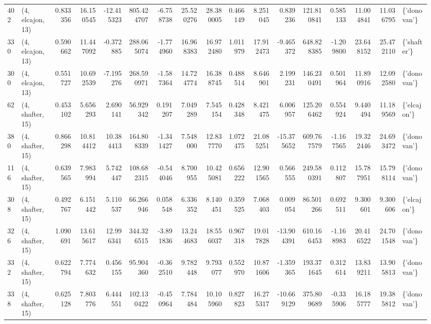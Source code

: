\begin{tabular}{llrrrrrrrrrrrrrrl}
402 &  (4, elcajon, 13) &   0.833356 &  16.150545 & -12.415323 &   805.424707 &  -6.758738 &  25.520276 &  28.380005 &  0.466149 &   8.251045 &   0.839236 &   121.810841 &   0.585133 &  11.004841 &  11.036795 &  \{'donovan'\} \\
330 &  (4, elcajon, 13) &   0.590662 &  11.447092 &  -0.372885 &   288.065074 &  -1.774960 &  16.968383 &  16.972480 &  1.011979 &  17.912473 &  -9.465372 &   648.828385 &  -1.209800 &  23.648152 &  25.472110 &  \{'shafter'\} \\
300 &  (4, elcajon, 13) &   0.551727 &  10.692539 &  -7.195276 &   268.590971 &  -1.587364 &  14.724774 &  16.388745 &  0.488514 &   8.646901 &   2.199231 &   146.230491 &   0.501964 &  11.890916 &  12.092580 &  \{'donovan'\} \\
62  &  (4, shafter, 15) &   0.453102 &   5.656293 &   2.690141 &    56.929342 &   0.191207 &   7.049289 &   7.545154 &  0.428348 &   8.421475 &   6.006957 &   125.206462 &   0.554924 &   9.440494 &  11.189569 &  \{'elcajon'\} \\
380 &  (4, shafter, 15) &   0.866298 &  10.814412 &  10.384413 &   164.808339 &  -1.341427 &   7.548000 &  12.837770 &  1.072475 &  21.085251 & -15.375652 &   609.767579 &  -1.167565 &  19.322446 &  24.693472 &  \{'donovan'\} \\
116 &  (4, shafter, 15) &   0.639565 &   7.983994 &   5.742447 &   108.682315 &  -0.544046 &   8.700955 &  10.425081 &  0.656222 &  12.901565 &   0.566555 &   249.580391 &   0.112807 &  15.787951 &  15.798114 &  \{'donovan'\} \\
308 &  (4, shafter, 15) &   0.492767 &   6.151442 &   5.110537 &    66.266946 &   0.058548 &   6.336352 &   8.140451 &  0.359525 &   7.068403 &   0.009054 &    86.501266 &   0.692511 &   9.300601 &   9.300606 &  \{'elcajon'\} \\
326 &  (4, shafter, 15) &   1.090691 &  13.615617 &  12.996341 &   344.326515 &  -3.891836 &  13.244683 &  18.556037 &  0.967318 &  19.017828 & -13.904391 &   610.166453 &  -1.168983 &  20.416522 &  24.701548 &  \{'donovan'\} \\
332 &  (4, shafter, 15) &   0.622794 &   7.774632 &   0.456155 &    95.904360 &  -0.362510 &   9.782448 &   9.793077 &  0.552970 &  10.871606 &  -1.359365 &   193.371645 &   0.312614 &  13.839211 &  13.905813 &  \{'donovan'\} \\
338 &  (4, shafter, 15) &   0.625128 &   7.803776 &   6.444551 &   102.130422 &  -0.450964 &   7.784484 &  10.105960 &  0.827823 &  16.275317 & -10.669129 &   375.809689 &  -0.335906 &  16.185777 &  19.385812 &  \{'donovan'\} \\

\end{tabular}
